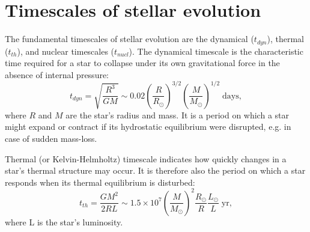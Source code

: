 \section{Timescales of stellar evolution}\label{sec:timescales}

The fundamental timescales of stellar evolution are the dynamical ($t_{dyn}$), thermal ($t_{th}$), and nuclear timescales ($t_{nucl}$). The dynamical timescale is the characteristic time required for a star to collapse under its own gravitational force in the absence of internal pressure:
\begin{equation}\label{eq:dynamical_timsecale}
    t_{dyn} = \sqrt{\frac{R^3}{GM}} \sim 0.02 \left( \frac{R}{R_{\odot}} \right)^{3/2} \left( \frac{M}{M_{\odot}}\right)^{1/2} \; \text{days},
\end{equation}
where $R$ and $M$ are the star's radius and mass. It is a period on which a star might expand or contract if its hydrostatic equilibrium were disrupted, e.g. in case of sudden mass-loss.

Thermal (or Kelvin-Helmholtz) timescale indicates how quickly changes in a star's thermal structure may occur. It is therefore also the period on which a star responds when its thermal equilibrium is disturbed:
\begin{equation}\label{eq:thermal_timsecale}
    t_{th} = \frac{G M^2}{2RL} \sim 1.5 \times 10^7 \left( \frac{M}{M_{\odot}} \right)^{2} \frac{R_{\odot}}{R} \frac{L_{\odot}}{L} \; \text{yr},
\end{equation}
where L is the star's luminosity.

